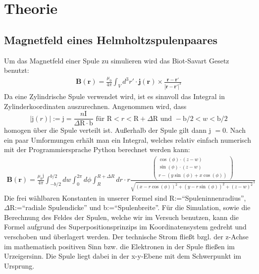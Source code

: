 \documentclass[12pt,a4paper]{article}
\begin{document}
\section{Theorie}
\subsection{Magnetfeld eines Helmholtzspulenpaares}
Um das Magnetfeld einer Spule zu simulieren wird das Biot-Savart Gesetz benutzt:
\begin{align}
\textbf{B}(\textbf{r}) = \frac{\mu_0}{4\pi}\int_{V} d^3r' \cdot \textbf{j}(\textbf{r}) \times \frac{\textbf{r}-\textbf{r}'}{|\textbf{r}-\textbf{r}'|^3}
\end{align}
Da eine Zylindrische Spule verwendet wird, ist es sinnvoll das Integral in Zylinderkoordinaten auszurechnen.
Angenommen wird, dass  
\begin{equation*}
|\text{j}(r)| := \text{j} = \frac{n\text{I}}{\Delta\text{R}\cdot\text{b}} \text{ für } \text{R}<r<\text{R}+\Delta\text{R} \text{ und } -\text{b}/2<w<\text{b}/2
\end{equation*} homogen über die Spule verteilt ist. Außerhalb der Spule gilt dann j $= 0$.
Nach ein paar Umformungen erhält man ein Integral, welches relativ einfach numerisch mit der Programmiersprache Python berechnet werden kann:
\begin{align}
\textbf{B}(\textbf{r}) = \frac{\mu_0\text{j}}{4\pi}\int_{-b/2}^{b/2}dw\int_{0}^{2\pi}d\phi\int_{R}^{R+\Delta R}dr \cdot r \frac{\begin{pmatrix}
\cos(\phi)\cdot (z-w) \\
\sin(\phi)\cdot (z-w) \\
r-(y\sin(\phi)+x\cos(\phi))
\end{pmatrix}}{\sqrt{(x-r\cos(\phi))^2+(y-r\sin(\phi))^2+(z-w)^2}^3}
\end{align}
Die frei wählbaren Konstanten in unserer Formel sind R:="`Spuleninnenradius"', $\Delta$R:="`radiale Spulendicke"' und b:="`Spulenbreite"'.
Für die Simulation, sowie die Berechnung des Feldes der Spulen, welche wir im Versuch benutzen, kann die Formel aufgrund des Superpositionsprinzips im Koordinatensystem gedreht und verschoben und überlagert werden. Der technische Strom fließt bzgl. der z-Achse im mathematisch positiven Sinn bzw. die Elektronen in der Spule fließen im Urzeigersinn. Die Spule liegt dabei in der x-y-Ebene mit dem Schwerpunkt im Ursprung.
\end{document}
